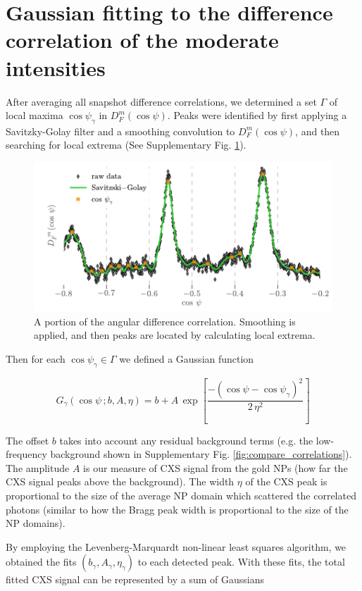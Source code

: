 \documentclass [12pt,fleqn]{article}
\def \be {\begin{equation}}
\def \ee {\end{equation}}
\begin{document}
\section{Gaussian fitting to the difference correlation of the moderate intensities} \label{supp:Gauss}
After averaging all snapshot difference correlations, we determined a set $\Gamma$ of local maxima $\cos \psi_\gamma$ in $D^m_F(\cos \psi)$. Peaks were identified by first applying a Savitzky-Golay filter \cite{savitzky1964smoothing} and a smoothing convolution to $D^m_F(\cos \psi)$, and then searching for local extrema (See Supplementary Fig. \ref{fig:peak_detection}).

\begin{figure}[H]
\includegraphics[]{supp_figs/peak_detection.pdf}
\caption{A portion of the angular difference correlation. Smoothing is applied, and then peaks are located by calculating local extrema.}
\label{fig:peak_detection}
\end{figure}

Then for each $\cos \psi_\gamma \in \Gamma$ we defined a Gaussian function

\be
G_\gamma (\cos \psi \,;  b,A, \eta)  =  b +  A\,\exp \left [ \frac{-\left( \cos \psi - \cos\psi_\gamma \right)^2}  {2\,\eta^2}  \right ]
\ee

The offset $b$ takes into account any residual background terms (e.g. the low-frequency background shown in Supplementary Fig. \ref{fig:compare_correlations}). The amplitude $A$ is our measure of CXS signal from the gold NPs (how far the CXS signal peaks above the background). The width $\eta$ of the CXS peak is proportional to the size of the average NP domain which scattered the correlated photons (similar to how the Bragg peak width is proportional to the size of the NP domains).

By employing the Levenberg-Marquardt non-linear least squares algorithm, we obtained the fits $(b_\gamma, A_\gamma, \eta_\gamma)$ to each detected peak. With these fits, the total fitted CXS signal can be represented by a sum of Gaussians
\end{document}

